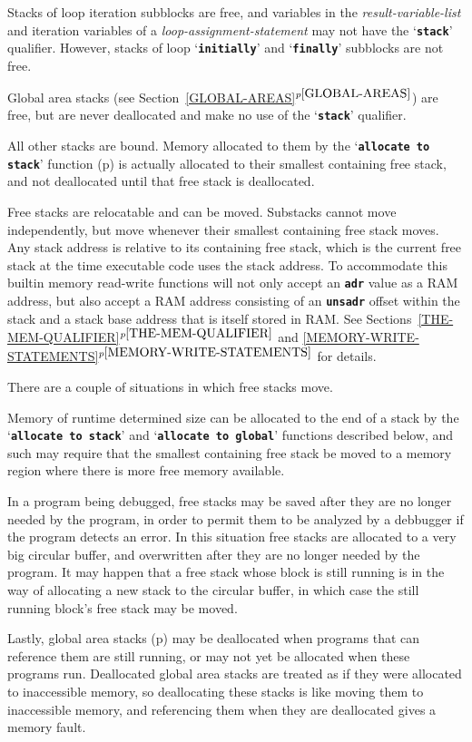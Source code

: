 \documentclass[12pt]{article}
\newcommand{\TT}[1]{{\tt \bfseries #1}}
\newcommand{\itemref}[1]{\ref{#1}$^{p\pageref{#1}}$}
\newcommand{\pagref}[1]{p\pageref{#1}}
\begin{document}
Stacks of loop iteration subblocks are free, and
variables in the {\em result-variable-list}
and iteration variables
of a {\em loop-assignment-statement} may not have the `\TT{stack}'
qualifier.  However, stacks of loop `\TT{initially}' and `\TT{finally}'
subblocks are not free.

Global area stacks (see Section~\itemref{GLOBAL-AREAS}) are free,
but are never deallocated and make no use of the `\TT{stack}'
qualifier.

All other stacks are bound.  Memory allocated to them
by the `\TT{allocate to stack}' function (\pagref{ALLOCATE-TO-STACK})
is actually
allocated to their smallest containing free stack, and not deallocated
until that free stack is deallocated.

Free stacks are relocatable and can be moved.
Substacks cannot move independently,
but move whenever their smallest containing free stack moves.
Any stack address is relative to its containing free stack,
which is the current free stack at the time executable code uses
the stack address.  To accommodate this builtin memory read-write
functions will not only accept an \TT{adr} value as a RAM address,
but also accept a RAM address consisting of an \TT{unsadr}
offset within the stack and a stack base address that is itself
stored in RAM.  See Sections~\itemref{THE-MEM-QUALIFIER}
and \itemref{MEMORY-WRITE-STATEMENTS}
for details.

There are a couple of situations in which free stacks move.

Memory of runtime determined size can be allocated to the end of
a stack by the `\TT{allocate to stack}' and `\TT{allocate to global}'
functions described below, and such may
require that the smallest containing free stack
be moved to a memory region where there is more free memory available.

In a program being debugged, free stacks may be saved after they are no
longer needed by the program, in order to permit them to be analyzed
by a debbugger if the program detects an error.  In this situation
free stacks are allocated to a very big circular buffer, and overwritten
after they are no longer needed by the program.  It may happen that
a free stack whose block is still running is in the way of allocating
a new stack to the circular buffer, in which case the still running
block's free stack may be moved.

Lastly, global area stacks (\pagref{GLOBAL-AREAS})
may be deallocated when programs that
can reference them are still running, or may not yet be allocated
when these programs run.  Deallocated global area stacks are treated as if
they were allocated to inaccessible memory, so deallocating these stacks
is like moving them to inaccessible memory, and referencing
them when they are deallocated gives a memory fault.
\end{document}
